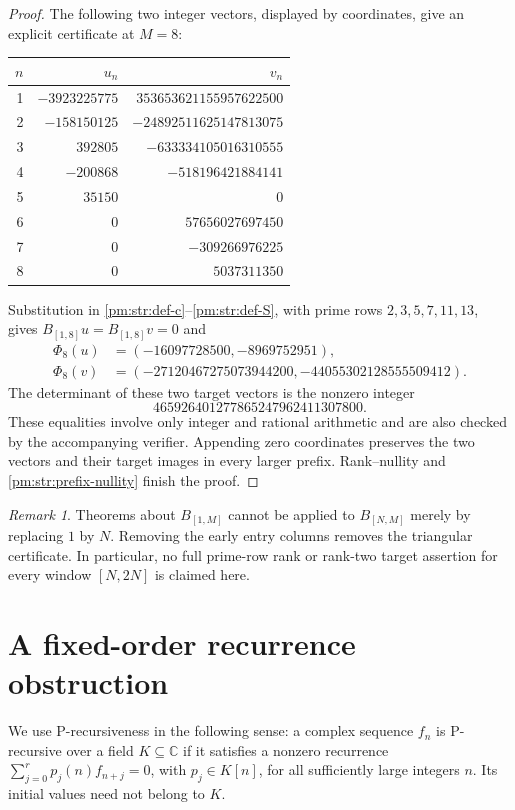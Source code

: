 \documentclass[11pt,a4paper]{article}
\theoremstyle{definition}
\theoremstyle{remark}
\newtheorem{remark}[theorem]{Remark}
\numberwithin{equation}{section}
\begin{document}
\begin{proof}
The following two integer vectors, displayed by coordinates, give an
explicit certificate at $M=8$:
\begin{center}
\begin{tabular}{r|r|r}
$n$ & $u_n$ & $v_n$\\\hline
1 & $-3923225775$ & $353653621155957622500$\\
2 & $-158150125$ & $-24892511625147813075$\\
3 & $392805$ & $-633334105016310555$\\
4 & $-200868$ & $-518196421884141$\\
5 & $35150$ & $0$\\
6 & $0$ & $57656027697450$\\
7 & $0$ & $-309266976225$\\
8 & $0$ & $5037311350$
\end{tabular}
\end{center}
Substitution in \eqref{pm:str:def-c}--\eqref{pm:str:def-S}, with prime rows
$2,3,5,7,11,13$, gives $B_{[1,8]}u=B_{[1,8]}v=0$ and
\begin{align*}
 \Phi_8(u)&=(-16097728500,-8969752951),\\
 \Phi_8(v)&=(-27120467275073944200,-44055302128555509412).
\end{align*}
The determinant of these two target vectors is the nonzero integer
\[
 465926401277865247962411307800.
\]
These equalities involve only integer and rational arithmetic and are
also checked by the accompanying verifier.  Appending zero coordinates
preserves the two vectors and their target images in every larger
prefix.  Rank--nullity and \eqref{pm:str:prefix-nullity} finish the proof.
\end{proof}

\begin{remark}\label{pm:str:prefix-scope}
Theorems about $B_{[1,M]}$ cannot be applied to $B_{[N,M]}$ merely by
replacing $1$ by $N$.  Removing the early entry columns removes the
triangular certificate.  In particular, no full prime-row rank or
rank-two target assertion for every window $[N,2N]$ is claimed here.
\end{remark}

\section{A fixed-order recurrence obstruction}
\label{pm:str:sec-recurrence}

We use P-recursiveness in the following sense: a complex sequence $f_n$
is P-recursive over a field $K\subseteq\mathbb C$ if it satisfies a
nonzero recurrence $\sum_{j=0}^r p_j(n)f_{n+j}=0$, with
$p_j\in K[n]$, for all sufficiently large integers $n$.  Its initial
values need not belong to $K$.
\end{document}
